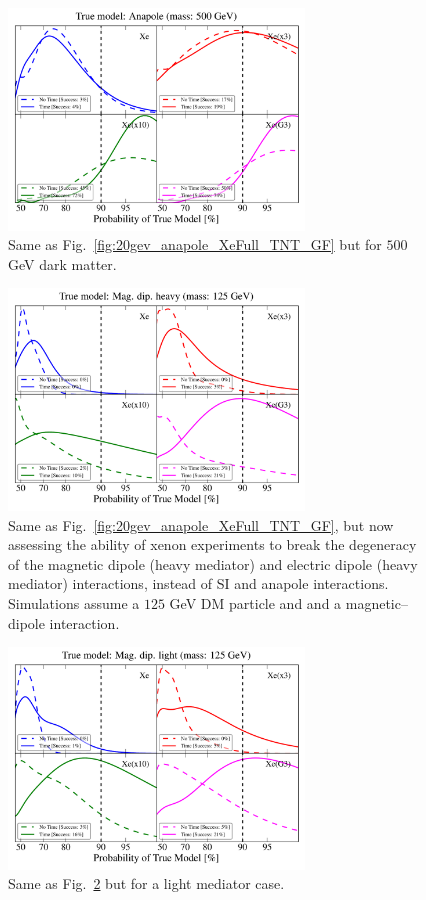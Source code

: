 \documentclass[11pt]{article}
\newcommand{\Fig}[1]{Fig.~\ref{#1}} \newcommand{\Figs}[2]{Figs.~\ref{#1} and \ref{#2}}
\begin{document}
\begin{figure}
\centering
\includegraphics[width=0.7\textwidth]{plots/PDF_500GeV_Anapole_50sims_Xe_Xe3x_Xe10x_XeG3_GF_TNT.pdf}
\caption{\label{fig:500gev_anapole_XeFull_TNT_GF}
Same as Fig.~\ref{fig:20gev_anapole_XeFull_TNT_GF} but for $500$ GeV dark matter.}
\end{figure}
\begin{figure}
\centering
\includegraphics[width=0.7\textwidth]{plots/PDF_125GeV_Magdipheavy_50sims_Xe_Xe3x_Xe10x_XeG3_GF_TNT.pdf}
\caption{\label{fig:125gev_Mag.dip.heavy_XeFull_TNT_GF}
Same as Fig.~\ref{fig:20gev_anapole_XeFull_TNT_GF}, but now assessing the ability of xenon experiments to break the degeneracy of the magnetic dipole (heavy mediator) and electric dipole (heavy mediator) interactions, instead of SI and anapole interactions. Simulations assume a $125$ GeV DM particle and and a magnetic--dipole interaction.}
\end{figure}
\begin{figure}
\centering
\includegraphics[width=0.7\textwidth]{plots/PDF_125GeV_Magdiplight_50sims_Xe_Xe3x_Xe10x_XeG3_GF_TNT.pdf}
\caption{\label{fig:125gev_Mag.dip.light_XeFull_TNT_GF}
Same as \Fig{fig:125gev_Mag.dip.heavy_XeFull_TNT_GF} but for a light mediator case. }
\end{figure}
\end{document}
